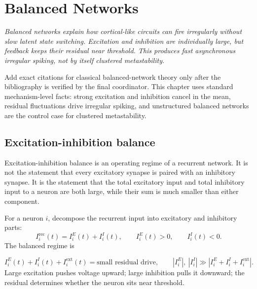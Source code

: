 \chapter{Balanced Networks}
\label{ch:balanced-networks}

\textit{Balanced networks explain how cortical-like circuits can fire irregularly without slow latent state switching. Excitation and inhibition are individually large, but feedback keeps their residual near threshold. This produces fast asynchronous irregular spiking, not by itself clustered metastability.}

\begin{aside}
Add exact citations for classical balanced-network theory only after the bibliography is verified by the final coordinator. This chapter uses standard mechanism-level facts: strong excitation and inhibition cancel in the mean, residual fluctuations drive irregular spiking, and unstructured balanced networks are the control case for clustered metastability.
\end{aside}

\section{Excitation-inhibition balance}
\label{sec:excitation-inhibition-balance}

Excitation-inhibition balance is an operating regime of a recurrent network. It is not the statement that every excitatory synapse is paired with an inhibitory synapse. It is the statement that the total excitatory input and total inhibitory input to a neuron are both large, while their sum is much smaller than either component.

For a neuron $i$, decompose the recurrent input into excitatory and inhibitory parts:
%
\begin{equation}
  I_i^{\mathrm{rec}}(t)
  =
  I_i^E(t)+I_i^I(t),
  \qquad
  I_i^E(t)>0,
  \qquad
  I_i^I(t)<0 .
  \label{eq:ei-input-decomposition}
\end{equation}
%
The balanced regime is
%
\begin{keyequation}
\begin{equation}
  I_i^E(t)+I_i^I(t)+I_i^{\mathrm{ext}}(t)
  =
  \text{small residual drive},
  \qquad
  |I_i^E|,\ |I_i^I|
  \gg
  |I_i^E+I_i^I+I_i^{\mathrm{ext}}|.
  \label{eq:balance-cancellation-ch04}
\end{equation}
\tcblower
Large excitation pushes voltage upward; large inhibition pulls it downward; the residual determines whether the neuron sits near threshold.
\end{keyequation}

